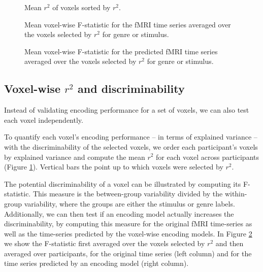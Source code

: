 \begin{figure}
  \centering
  \def\svgwidth{\linewidth}
  
	
  \caption{ Mean $r^2$ of voxels sorted by $r^2$.}

 \label{fig:r2}
\end{figure}

\begin{figure}
  \centering
  \def\svgwidth{\linewidth}
  
	
  \caption{ Mean voxel-wise F-statistic for the f{MRI} time series averaged over
  the voxels selected by $r^2$ for genre or stimulus.}

 \label{fig:anova}
\end{figure}

\begin{figure}
  \centering
  \def\svgwidth{\linewidth}
  
	
  \caption{ Mean voxel-wise F-statistic for the predicted f{MRI} time series averaged over
  the voxels selected by $r^2$ for genre or stimulus.}

 \label{fig:anova_yhat}
\end{figure}


\subsection*{Voxel-wise $r^2$ and discriminability}
%
Instead of validating encoding performance for a set of voxels, we can also test
each voxel independently.

To quantify each voxel's encoding performance -- in terms of explained
variance -- with the discriminability of the selected voxels, we order each
participant's voxels by explained variance and compute the mean $r^2$ for each
voxel across participants (Figure \ref{fig:r2}). Vertical bars the point up to
which voxels were selected by $r^2$. 

The potential discriminability of a voxel can be illustrated by computing its
F-statistic. This measure is the between-group variability divided by the within-group
variability, where the groups are either the stimulus or genre labels. 
Additionally, we can then test if an encoding model actually increases the
discriminability, by computing this measure for the original f{MRI} time-series as well
as the time-series predicted by the voxel-wise encoding models. In Figure
\ref{fig:anova} we show the F-statistic first averaged over the
voxels selected by $r^2$ and then averaged over participants, for the original
time series (left column) and for the time series predicted by an encoding model
(right column).

